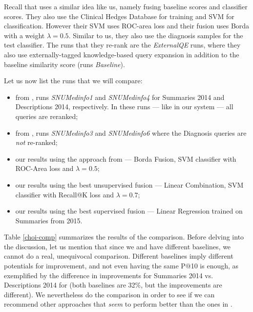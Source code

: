 Recall that \cite{choi} uses a similar idea like us, namely fusing baseline scores and
classifier scores. They also use the Clinical Hedges Database for training and SVM for classification.
However their SVM uses ROC-area loss and their fusion uses Borda with a weight $\lambda=0.5$.
Similar to us, they also use the diagnosis samples for the test classifier.
The runs that they re-rank are the \emph{ExternalQE} runs, where
they also use externally-tagged knowledge-based query expansion in addition to the baseline similarity score
(runs \emph{Baseline}).

Let us now list the runs that we will compare:
\begin{itemize}
 \item from \cite{choi}, runs \emph{SNUMedinfo1} and \emph{SNUMedinfo4} for Summaries 2014 and Descriptions 2014, respectively.
  In these runs --- like in our system --- all queries are reranked;
 \item from \cite{choi}, runs \emph{SNUMedinfo3} and \emph{SNUMedinfo6} where the Diagnosis queries are \emph{not} re-ranked;
 \item our results using the approach from \cite{choi} --- Borda Fusion, SVM classifier with ROC-Area loss and $\lambda=0.5$;
 \item our results using the best unsupervised fusion --- Linear Combination, SVM classifier with Recall@K loss and $\lambda=0.7$;
 \item our results using the best supervised fusion --- Linear Regression trained on Summaries from 2015.
\end{itemize}

Table \ref{choi-comp} summarizes the results of the comparison.
Before delving into the discussion, let us mention that since we and \cite{choi} have different baselines,
we cannot do a real, unequivocal comparison. Different baselines imply different potentials for improvement, and
not even having the same P@10 is enough, as exemplified by the difference in improvements for Summaries
2014 vs. Descriptions 2014 for \cite{choi} (both baselines are 32\%, but the improvements are different).
We nevertheless do the comparison in order to see if we can recommend other approaches that \emph{seem}
to perform better than the ones in \cite{choi}.

